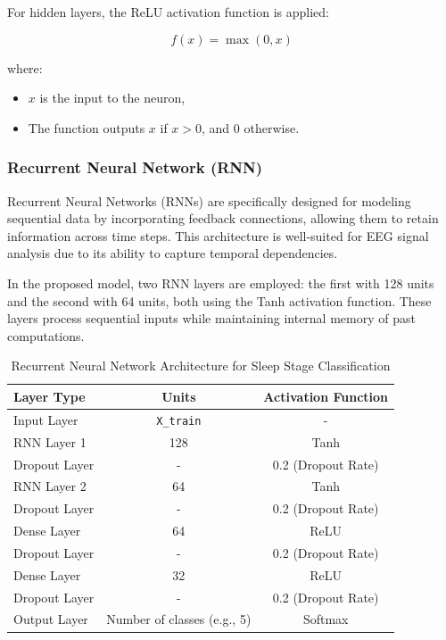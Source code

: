 For hidden layers, the ReLU activation function is applied:

\begin{equation}
	f(x) = \max(0, x)
\end{equation}

\noindent where:
\begin{itemize}
	\item \( x \) is the input to the neuron,
	\item The function outputs \( x \) if \( x > 0 \), and 0 otherwise.
\end{itemize}


\subsubsection{Recurrent Neural Network (RNN)}

Recurrent Neural Networks (RNNs) are specifically designed for modeling sequential data by incorporating feedback connections, allowing them to retain information across time steps. This architecture is well-suited for EEG signal analysis due to its ability to capture temporal dependencies.

In the proposed model, two RNN layers are employed: the first with 128 units and the second with 64 units, both using the Tanh activation function. These layers process sequential inputs while maintaining internal memory of past computations.

\begin{table}[!h]
	\centering
	\caption{Recurrent Neural Network Architecture for Sleep Stage Classification}
	\label{tab:rnn_architecture}
	\begin{tabular}{lcc}
		\hline
		\textbf{Layer Type} & \textbf{Units} & \textbf{Activation Function} \\
		\hline
		Input Layer         & \texttt{X\_train}          & - \\
		RNN Layer 1         & 128                        & Tanh \\
		Dropout Layer       & -                          & 0.2 (Dropout Rate) \\
		RNN Layer 2         & 64                         & Tanh \\
		Dropout Layer       & -                          & 0.2 (Dropout Rate) \\
		Dense Layer         & 64                         & ReLU \\
		Dropout Layer       & -                          & 0.2 (Dropout Rate) \\
		Dense Layer         & 32                         & ReLU \\
		Dropout Layer       & -                          & 0.2 (Dropout Rate) \\
		Output Layer        & Number of classes (e.g., 5) & Softmax \\
		\hline
	\end{tabular}
\end{table}

